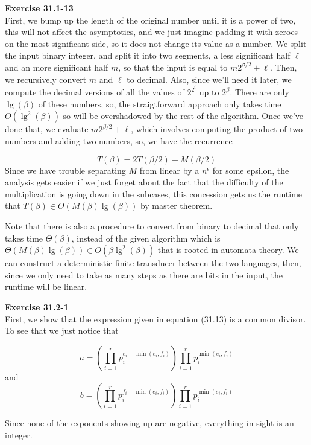 \documentclass{article}
\begin{document}
\noindent\textbf{Exercise 31.1-13}\\

First, we bump up the length of the original number until it is a power of two, this will not affect the asymptotics, and we just imagine padding it with zeroes on the most significant side, so it does not change its value as a number. We split the input binary integer, and split it into two segments, a less significant half $\ell$ and an more significant half $m$, so that the input is equal to $m2^{\beta/2} + \ell$. Then, we recursively convert $m$ and $\ell$ to decimal. Also, since we'll need it later, we compute the decimal versions of all the values of $2^{2^i}$ up to $2^{\beta}$. There are only $\lg(\beta)$ of these numbers, so, the straigtforward approach only takes time $O(\lg^2(\beta))$ so will be overshadowed by the rest of the algorithm. Once we've done that, we evaluate $m2^{\beta/2} + \ell$, which involves computing the product of two numbers and adding two numbers, so, we have the recurrence

\[
T( \beta) = 2T(\beta/2) + M(\beta/2)
\]
Since we have trouble separating $M$ from linear by a $n^{\epsilon}$ for some epsilon, the analysis gets easier if we just forget about the fact that the difficulty of the multiplication is going down in the subcases, this concession gets us the runtime that $T(\beta) \in O(M(\beta) \lg(\beta))$ by master theorem.

Note that there is also a procedure to convert from binary to decimal that only takes time $\Theta(\beta)$, instead of the given algorithm which is $\Theta(M(\beta)\lg(\beta)) \in O(\beta \lg^2(\beta))$ that is rooted in automata theory. We can construct a deterministic finite transducer between the two languages, then, since we only need to take as many steps as there are bits in the input, the runtime will be linear. 



\noindent\textbf{Exercise 31.2-1}\\

First, we show that the expression given in equation (31.13) is a common divisor. To see that we just notice that 

\[
a = (\prod_{i=1}^r p_i^{e_i-\min(e_i,f_i)})\prod_{i=1}^r p_i^{\min(e_i,f_i)}
\]
and 
\[
b = (\prod_{i=1}^r p_i^{f_i-\min(e_i,f_i)})\prod_{i=1}^r p_i^{\min(e_i,f_i)}
\]

Since none of the exponents showing up are negative, everything in sight is an integer.
\end{document}
